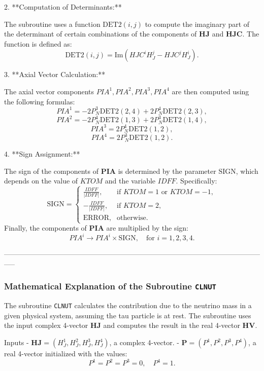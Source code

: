 \documentclass[12pt]{article}
\begin{document}
2. **Computation of Determinants:**

   The subroutine uses a function \(\text{DET2}(i, j)\) to compute the imaginary part of the determinant of certain combinations of the components of \(\mathbf{HJ}\) and \(\mathbf{HJC}\). The function is defined as:
   \[
   \text{DET2}(i, j) = \text{Im}(HJC^i H_J^j - HJC^j H_J^i).
   \]

3. **Axial Vector Calculation:**

   The axial vector components \(PIA^1, PIA^2, PIA^3, PIA^4\) are then computed using the following formulas:
   \[
   PIA^1 = -2 P_N^3 \text{DET2}(2, 4) + 2 P_N^4 \text{DET2}(2, 3),
   \]
   \[
   PIA^2 = -2 P_N^4 \text{DET2}(1, 3) + 2 P_N^3 \text{DET2}(1, 4),
   \]
   \[
   PIA^3 = 2 P_N^4 \text{DET2}(1, 2),
   \]
   \[
   PIA^4 = 2 P_N^3 \text{DET2}(1, 2).
   \]

4. **Sign Assignment:**

   The sign of the components of \(\mathbf{PIA}\) is determined by the parameter \(\text{SIGN}\), which depends on the value of \(KTOM\) and the variable \(IDFF\). Specifically:
   \[
   \text{SIGN} = 
   \begin{cases}
   \frac{IDFF}{|IDFF|}, & \text{if } KTOM = 1 \text{ or } KTOM = -1, \\
   -\frac{IDFF}{|IDFF|}, & \text{if } KTOM = 2, \\
   \text{ERROR}, & \text{otherwise}.
   \end{cases}
   \]
   Finally, the components of \(\mathbf{PIA}\) are multiplied by the sign:
   \[
   PIA^i \rightarrow PIA^i \times \text{SIGN}, \quad \text{for } i = 1, 2, 3, 4.
   \]


-----------------------------------------------------------------------------------------------------------------\\
\subsubsection*{Mathematical Explanation of the Subroutine \texttt{CLNUT}}

The subroutine \texttt{CLNUT} calculates the contribution due to the neutrino mass in a given physical system, assuming the tau particle is at rest. The subroutine uses the input complex 4-vector \(\mathbf{HJ}\) and computes the result in the real 4-vector \(\mathbf{HV}\).

Inputs
- \(\mathbf{HJ} = (H_J^1, H_J^2, H_J^3, H_J^4)\), a complex 4-vector.
- \(\mathbf{P} = (P^1, P^2, P^3, P^4)\), a real 4-vector initialized with the values:
  \[
  P^1 = P^2 = P^3 = 0, \quad P^4 = 1.
  \]
\end{document}
